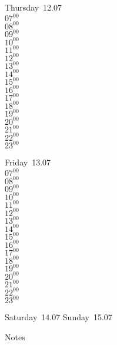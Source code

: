\documentclass[11pt, a4paper]{book}\usepackage[]{graphicx}\usepackage[]{color}
\begin{document}
\begin{weekdaybox}
  Thursday~12.07\\
  { 
  \vfill
  $07^{00}$\\
$08^{00}$\\
$09^{00}$\\
$10^{00}$\\
$11^{00}$\\
$12^{00}$\\
$13^{00}$\\
$14^{00}$\\
$15^{00}$\\
$16^{00}$\\
$17^{00}$\\
$18^{00}$\\
$19^{00}$\\
$20^{00}$\\
$21^{00}$\\
$22^{00}$\\
$23^{00}$\\
  }
\end{weekdaybox} 
\begin{weekdaybox}
  Friday~13.07\\
  { 
  \vfill
  $07^{00}$\\
$08^{00}$\\
$09^{00}$\\
$10^{00}$\\
$11^{00}$\\
$12^{00}$\\
$13^{00}$\\
$14^{00}$\\
$15^{00}$\\
$16^{00}$\\
$17^{00}$\\
$18^{00}$\\
$19^{00}$\\
$20^{00}$\\
$21^{00}$\\
$22^{00}$\\
$23^{00}$\\
  }
\end{weekdaybox}
\begin{weekendbox}
  Saturday~14.07
  \tcblower
  Sunday~15.07
\end{weekendbox} %
\begin{notebox}
  Notes
\end{notebox}
\clearpage
\end{document}
